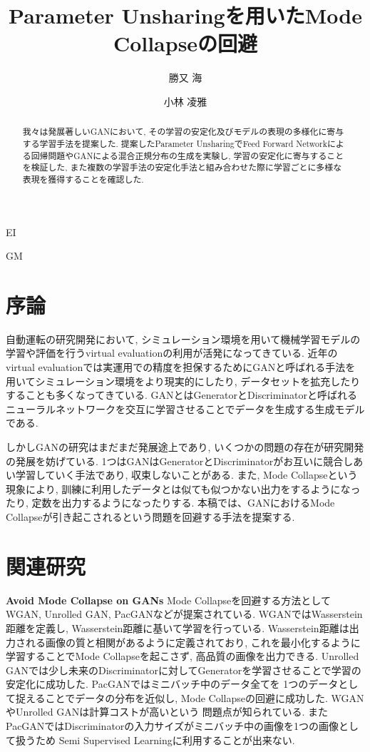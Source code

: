 \documentclass[techrep, submit, noauthor,preface]{ipsj}
\begin{document}
\title{Parameter Unsharingを用いたMode Collapseの回避}


\author{勝又 海}{}{EI}
\author{小林 凌雅}{}{GM}

\maketitle
\thispagestyle{empty} 
\begin{abstract}

  我々は発展著しいGANにおいて, その学習の安定化及びモデルの表現の多様化に寄与する学習手法を提案した.
  提案したParameter UnsharingでFeed Forward Networkによる回帰問題やGANによる混合正規分布の生成を実験し,
  学習の安定化に寄与することを検証した,
  また複数の学習手法の安定化手法と組み合わせた際に学習ごとに多様な表現を獲得することを確認した.

\end{abstract}

\section{序論}

自動運転の研究開発において, シミュレーション環境を用いて機械学習モデルの学習や評価を行うvirtual evaluationの利用が活発になってきている.
近年のvirtual evaluationでは実運用での精度を担保するためにGANと呼ばれる手法を用いてシミュレーション環境をより現実的にしたり, 
データセットを拡充したりすることも多くなってきている.
GANとはGeneratorとDiscriminatorと呼ばれるニューラルネットワークを交互に学習させることでデータを生成する生成モデルである.

しかしGAN\cite{gan}の研究はまだまだ発展途上であり, いくつかの問題の存在が研究開発の発展を妨げている\cite{tutorial}.
1つはGANはGeneratorとDiscriminatorがお互いに競合しあい学習していく手法であり, 収束しないことがある.
また, Mode Collapseという現象により, 訓練に利用したデータとは似ても似つかない出力をするようになったり,
定数を出力するようになったりする.
本稿では、GANにおけるMode Collapseが引き起こされるという問題を回避する手法を提案する.

\section{関連研究}

{\bf Avoid Mode Collapse on GANs} Mode Collapseを回避する方法としてWGAN\cite{wgan}, Unrolled GAN\cite{unrolled}, PacGAN\cite{pacgan}などが提案されている.
WGANではWasserstein距離を定義し, Wasserstein距離に基いて学習を行っている.
Wasserstein距離は出力される画像の質と相関があるように定義されており, これを最小化するように学習することでMode Collapseを起こさず, 高品質の画像を出力できる.
Unrolled GANでは少し未来のDiscriminatorに対してGeneratorを学習させることで学習の安定化に成功した.
PacGANではミニバッチ中のデータ全てを
1つのデータとして捉えることでデータの分布を近似し, Mode Collapseの回避に成功した.
WGANやUnrolled GANは計算コストが高いという
問題点が知られている. またPacGANではDiscriminatorの入力サイズがミニバッチ中の画像を1つの画像として扱うため
Semi Supervised Learningに利用することが出来ない.
\end{document}
